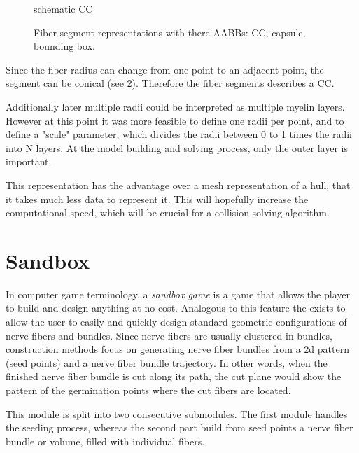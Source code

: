 %
\begin{figure}[!t]
    \centering
    \setlength{\tikzwidth}{0.5\textwidth}
	\caption{schematic  \ac{CC}}
	\label{fig:conical}
\end{figure}
%
\begin{figure}[!t]
    \centering
    \setlength{\tikzwidth}{0.75\textwidth}
    \tikzset{external/export=false}
	\caption[cc and co]{Fiber segment representations with there \acp{AABB}:  \ac{CC},  capsule,  bounding box.}
	\label{fig:conical_capsule}
\end{figure}
%
Since the fiber radius can change from one point to an adjacent point, the segment can be conical (see \cref{fig:conical_capsule}).
Therefore the fiber segments describes a \ac{CC}.
\par
%
Additionally later multiple radii could be interpreted as multiple myelin layers.
However at this point it was more feasible to define one radii per point, and to define a "scale" parameter, which divides the radii between 0 to 1 times the radii into N layers.
At the model building and solving process, only the outer layer is important.
\par
%
This representation has the advantage over a mesh representation of a hull, that it takes much less data to represent it.
This will hopefully increase the computational speed, which will be crucial for a collision solving algorithm.
%
\section{Sandbox}\label{sec:sandbox}
%
In computer game terminology, a \textit{sandbox game} is a game that allows the player to build and design anything at no cost.
Analogous to this feature the  exists to allow the user to easily and quickly design standard geometric configurations of nerve fibers and bundles.
Since nerve fibers are usually clustered in bundles, construction methods focus on generating nerve fiber bundles from a 2d pattern (seed points) and a nerve fiber bundle trajectory.
In other words, when the finished nerve fiber bundle is cut along its path, the cut plane would show the pattern of the germination points where the cut fibers are located.
%
\par
%
This module is split into two consecutive submodules.
The first module handles the seeding process, whereas the second part build from seed points a nerve fiber bundle or volume, filled with individual fibers.
%
